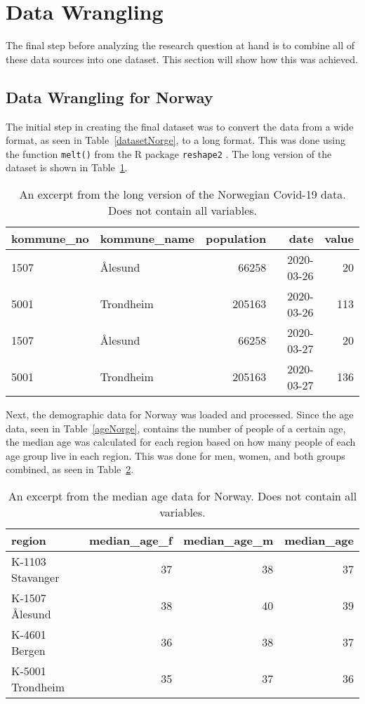 \section{Data Wrangling}
The final step before analyzing the research question at hand is to combine all of these data sources into one dataset. This section will show how this was achieved.
\subsection*{Data Wrangling for Norway}
The initial step in creating the final dataset was to convert the data from a wide format, as seen in Table~\ref{datasetNorge}, to a long format. This was done using the function \texttt{melt()} from the R package \texttt{reshape2} \cite{reshape2}. The long version of the dataset is shown in Table~\ref{norwayLong}.
\begin{table}[H] 
\caption{An excerpt from the long version of the Norwegian Covid-19 data. Does not contain all variables.\label{norwayLong}}
\begin{tabular}{l l r r r}
\toprule
\textbf{kommune\_no}	& \textbf{kommune\_name}	& \textbf{population} & \textbf{date} & \textbf{value}\\
\midrule
1507 & Ålesund & 66258 & 2020-03-26 & 20\\
5001 & Trondheim  & 205163  & 2020-03-26 & 113\\
1507 & Ålesund & 66258 & 2020-03-27 & 20\\
5001 & Trondheim  & 205163  & 2020-03-27 & 136\\
\bottomrule
\end{tabular}
\end{table}
Next, the demographic data for Norway was loaded and processed. Since the age data, seen in Table~\ref{ageNorge}, contains the number of people of a certain age, the median age was calculated for each region based on how many people of each age group live in each region. This was done for men, women, and both groups combined, as seen in Table~\ref{medianNorway}.
\begin{table}[H] 
\caption{An excerpt from the median age data for Norway. Does not contain all variables.\label{medianNorway}}
\begin{tabular}{l r r r}
\toprule
\textbf{region}	& \textbf{median\_age\_f} & \textbf{median\_age\_m} & \textbf{median\_age}\\
\midrule
K-1103 Stavanger & 37 & 38 & 37\\
K-1507 Ålesund & 38 & 40 & 39\\
K-4601 Bergen  & 36  & 38 & 37\\
K-5001 Trondheim  & 35  & 37 & 36\\
\bottomrule
\end{tabular}
\end{table}
